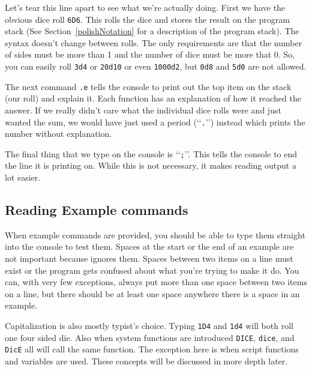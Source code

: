Let's tear this line apart to see what we're actually doing. First we have
the obvious dice roll \texttt{6D6}. This rolls the dice and stores the result
on the program stack (See Section~\ref{polishNotation} for a description of
the program stack). The syntax doesn't change between rolls. The only 
requirements are that the number of sides must be more than 1
and the number of dice must
be more that 0. So, you can easily roll \texttt{3d4} or \texttt{20d10} or even
\texttt{1000d2}, but \texttt{0d8} and \texttt{5d0} are not allowed.

The next command \texttt{.e}
tells the console to print out the top item on the stack (our roll)
and explain it. Each function has an explanation of how it reached the answer.
If we really didn't care what the individual dice rolls were and just wanted
the sum, we would have just used a period (\lq\lq\texttt{.}\rq\rq) instead which
prints the number without explanation.

The final thing that we type on the console is \lq\lq\texttt{;}\rq\rq. This tells
the console to end the line it is printing on. While this is not necessary, it
makes reading output a lot easier.

\subsection*{Reading Example commands}
When example commands are provided, you should be able to type them straight
into the console to test them. Spaces at the start or the end of an example
are not important because \progLogo ignores them. Spaces between two items on
a line must exist or the program gets confused  about what you're trying to
make it do. You can, with very few exceptions, always put more than one
space between two items on a line, but there should be at least one space
anywhere there is a space in an example.

Capitalization is also mostly typist's choice. Typing \texttt{1D4} and \texttt{1d4}
will both roll one four sided die. Also when system functions are introduced
\texttt{DICE}, \texttt{dice}, and \texttt{DicE} all will call the same function.
The exception here is when script functions and variables are used.
These concepts will be discussed in more depth later.

